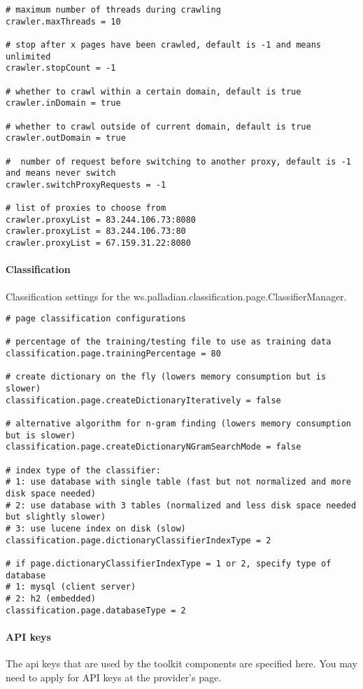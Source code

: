 \begin{verbatim}
# maximum number of threads during crawling
crawler.maxThreads = 10

# stop after x pages have been crawled, default is -1 and means unlimited
crawler.stopCount = -1

# whether to crawl within a certain domain, default is true
crawler.inDomain = true
	
# whether to crawl outside of current domain, default is true
crawler.outDomain = true

#  number of request before switching to another proxy, default is -1 and means never switch
crawler.switchProxyRequests = -1
	
# list of proxies to choose from
crawler.proxyList = 83.244.106.73:8080
crawler.proxyList = 83.244.106.73:80
crawler.proxyList = 67.159.31.22:8080
\end{verbatim}

\paragraph{Classification}
\label{sec:classification.conf}
Classification settings for the ws.palladian.classification.page.ClassifierManager.

\begin{verbatim}
# page classification configurations

# percentage of the training/testing file to use as training data
classification.page.trainingPercentage = 80

# create dictionary on the fly (lowers memory consumption but is slower)
classification.page.createDictionaryIteratively = false

# alternative algorithm for n-gram finding (lowers memory consumption but is slower)
classification.page.createDictionaryNGramSearchMode = false

# index type of the classifier:
# 1: use database with single table (fast but not normalized and more disk space needed)
# 2: use database with 3 tables (normalized and less disk space needed but slightly slower)
# 3: use lucene index on disk (slow)
classification.page.dictionaryClassifierIndexType = 2

# if page.dictionaryClassifierIndexType = 1 or 2, specify type of database
# 1: mysql (client server)
# 2: h2 (embedded)
classification.page.databaseType = 2
\end{verbatim}

\paragraph{API keys}
\label{sec:apikeys.conf}
The api keys that are used by the toolkit components are specified here. You may need to apply for API keys at the provider's page.

